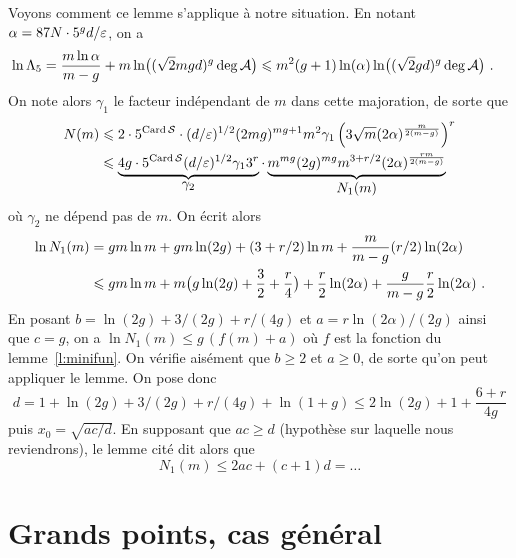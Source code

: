 Voyons comment ce lemme s'applique à notre situation. En notant \( \alpha =
  87 N \cdot 5^g d / \varepsilon \), on a
\begin{align}
  \ln\Lambda_5
  & =
  \frac{m \ln\alpha}{m-g}
  + m \ln \bigl( (\sqrt2 m g d)^g \deg\mathcal A \bigr)
  \leqslant
  m^2
  (g+1) \ln(\alpha) \ln \bigl( (\sqrt2 g d)^g \deg\mathcal A \bigr)
  \text{ .}
\end{align}
On note alors \( \gamma_1 \) le facteur indépendant de \( m \) dans cette
majoration, de sorte que
\begin{align}
  N(m)
  & \leqslant
  2 \cdot 5^{\operatorname{Card} \mathcal S} \cdot
  (d / \varepsilon)^{1/2}
  (2mg)^{mg+1}
  m^2 \gamma_1
  \left(
    3 \sqrt m (2\alpha)^{ \frac{m}{2(m-g)} }
  \right)^r
  \\ & \leqslant
  \underbrace{
    4 g \cdot 5^{\operatorname{Card} \mathcal S}
    (d / \varepsilon)^{1/2}
    \gamma_1 3^r
  }_{\displaystyle \gamma_2}
  \cdot
  \underbrace{
    m^{mg} (2g)^{mg} m^{3 + r/2} (2\alpha)^{ \frac{rm}{2(m-g)} }
  }_{\displaystyle N_1(m)}
\end{align}
où \( \gamma_2 \) ne dépend pas de \( m \). On écrit alors
\begin{align}
  \ln N_1(m)
  & =
  gm \ln m +
  gm \ln(2g)
  + (3 + r/2) \ln m
  + \frac{m}{m-g} (r/2) \ln(2\alpha)
  \\ & \leqslant
  gm \ln m +
  m \bigl( g \ln(2g) + \frac32 + \frac r4 \bigr)
  + \frac r2 \ln(2\alpha)
  + \frac{g}{m-g} \frac r2 \ln(2\alpha)
  \text{ .}
\end{align}
En posant \( b = \ln(2g) + 3/(2g) + r/(4g) \) et \( a = r \ln(2\alpha) / (2g) \)
ainsi que \( c = g \), on a \( \ln N_1(m) \le g \, ( f(m) + a) \) où \( f \)
est la fonction du lemme~\ref{l:minifun}. On vérifie aisément que \( b \ge 2
\) et \( a \ge 0 \), de sorte qu'on peut appliquer le lemme. On pose donc
\begin{equation}
  d
  =
  1 + \ln(2g) + 3/(2g) + r/(4g) + \ln(1+g)
  \le
  2 \ln(2g) + 1 + \frac{ 6 + r }{ 4g }
\end{equation}
puis \( x_0 = \sqrt{ac/d} \). En supposant que \( ac \ge d \) (hypothèse sur
laquelle nous reviendrons),  le lemme cité dit alors que
\begin{equation}
  N_1(m)
  \le
  2ac + (c+1) d
  =
  \dots %
\end{equation}



\section{Grands points, cas général}
\label{sec:any}

